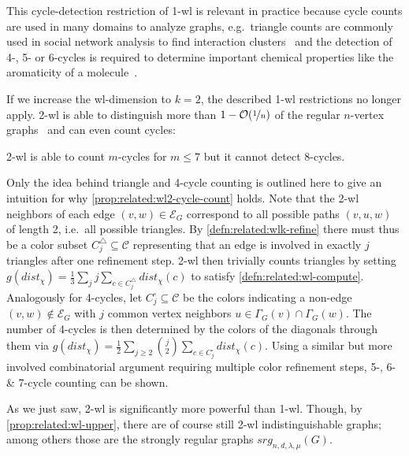 This cycle-detection restriction of 1-\acs{wl} is relevant in practice because cycle counts are used in many domains to analyze graphs, e.g.\ triangle counts are commonly used in social network analysis to find interaction clusters~\cite{Newman2003}\cite{Welser2007} and the detection of 4-, 5- or 6-cycles is required to determine important chemical properties like the aromaticity of a molecule~\cite{Adamson1973}\cite{Kekule1866}.

If we increase the \acs{wl}-dimension to $k = 2$, the described 1-\acs{wl} restrictions no longer apply.
2-\acs{wl} is able to distinguish more than $1 - \mathcal{O}(\nicefrac{1}{n})$ of the regular $n$-vertex graphs~\cite[cor.~1.8.6]{Immerman1990} and can even count cycles:
\begin{prop}\label{prop:related:wl2-cycle-count}
	2-\acs{wl} is able to count $m$-cycles for $m \leq 7$ but it cannot detect 8-cycles.
\end{prop}
\begin{hproof}
	Only the idea behind triangle and 4-cycle counting is outlined here to give an intuition for why \cref{prop:related:wl2-cycle-count} holds.
	Note that the 2-\acs{wl} neighbors of each edge $(v, w) \in \mathcal{E}_G$ correspond to all possible paths $(v, u, w)$ of length 2, i.e.\ all possible triangles.
	By \cref{defn:related:wlk-refine} there must thus be a color subset $C^{\triangle}_j \subseteq \mathcal{C}$ representing that an edge is involved in exactly $j$ triangles after one refinement step.
	2-\acs{wl} then trivially counts triangles by setting $g(\mathit{dist}_\chi) = \frac{1}{3} \sum_j j \sum_{c \in C^{\triangle}_j} \mathit{dist}_\chi(c)$ to satisfy \cref{defn:related:wl-compute}.
	Analogously for 4-cycles, let $C^{\square}_j \subseteq \mathcal{C}$ be the colors indicating a non-edge $(v, w) \notin \mathcal{E}_G$ with $j$ common vertex neighbors $u \in \Gamma_G(v) \cap \Gamma_G(w)$.
	The number of 4-cycles is then determined by the colors of the diagonals through them via $g(\mathit{dist}_\chi) = \frac{1}{2} \sum_{j \geq 2} \binom{j}{2} \sum_{c \in C^{\square}_j} \mathit{dist}_\chi(c)$.
	Using a similar but more involved combinatorial argument requiring multiple color refinement steps, 5-, 6- \& 7-cycle counting can be shown.
\end{hproof}
As we just saw, 2-\acs{wl} is significantly more powerful than 1-\acs{wl}.
Though, by \cref{prop:related:wl-upper}, there are of course still 2-\acs{wl} indistinguishable graphs;
among others those are the strongly regular graphs $\mathit{srg}_{n, d, \lambda, \mu}(G)$.
